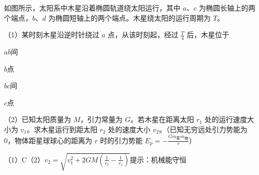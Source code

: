 如图所示，太阳系中木星沿着椭圆轨道绕太阳运行，其中 \(a\)、\(c\) 为椭圆长轴上的两个端点，\(b\)、\(d\) 为椭圆短轴上的两个端点。木星绕太阳的运行周期为 \(T\)。


（1）某时刻木星沿逆时针绕过 \(a\) 点，从该时刻起，经过 \(\frac{T}{4}\) 后，木星位于\paren[]
\begin{choices}
	\item \(ab\)间
	\item \(b\)点
	\item \(bc\)间
	\item \(c\)点
\end{choices}
（2）已知太阳质量为 \(M\)，引力常量为 \(G\)。若木星在距离太阳 \(r_1\) 处的运行速度大小为 \(v_1\)。求木星运行到距太阳 \(r_2\) 处的速度大小 \(v_2\)。（已知无穷远处引力势能为 0，物体距星球球心的距离为 \(r\) 时的引力势能 \(E_p = -\frac{Gm_{\text{星}}m_{\text{物}}}{r}\)）
\begin{answer}
	（1）C\:（2）\(v_2 = \sqrt{v_1^2 + 2GM(\frac{1}{r_2} - \frac{1}{r_1})}\)\qquad 提示：机械能守恒
\end{answer}